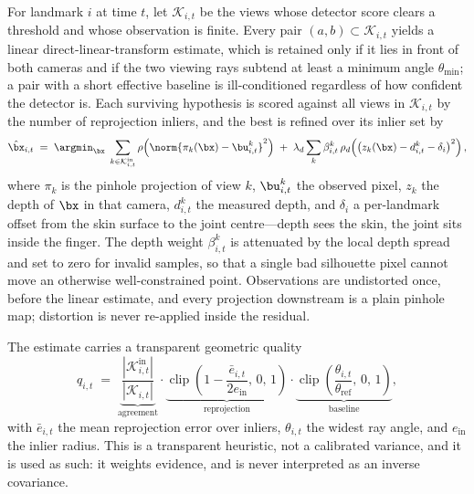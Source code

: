 For landmark $i$ at time $t$, let $\mathcal{K}_{i,t}$ be the views whose
detector score clears a threshold and whose observation is finite. Every pair
$(a,b) \subset \mathcal{K}_{i,t}$ yields a linear direct-linear-transform
estimate, which is retained only if it lies in front of both cameras and if the
two viewing rays subtend at least a minimum angle $\theta_{\min}$; a pair with a
short effective baseline is ill-conditioned regardless of how confident the
detector is. Each surviving hypothesis is scored against all views in
$\mathcal{K}_{i,t}$ by the number of reprojection inliers, and the best is
refined over its inlier set by
\begin{equation}
  \hat{\bx}_{i,t} \;=\;
  \argmin_{\bx}\;
  \sum_{k \in \mathcal{K}^{\text{in}}_{i,t}}
  \rho\!\left(\norm{\pi_k(\bx) - \bu^{k}_{i,t}}^{2}\right)
  \;+\;
  \lambda_d \sum_{k} \beta^{k}_{i,t}\,
  \rho_d\!\left(\left(z_k(\bx) - d^{k}_{i,t} - \delta_i\right)^{2}\right),
  \label{eq:triangulate}
\end{equation}
where $\pi_k$ is the pinhole projection of view $k$, $\bu^{k}_{i,t}$ the
observed pixel, $z_k$ the depth of $\bx$ in that camera, $d^{k}_{i,t}$ the
measured depth, and $\delta_i$ a per-landmark offset from the skin surface to
the joint centre---depth sees the skin, the joint sits inside the finger. The
depth weight $\beta^{k}_{i,t}$ is attenuated by the local depth spread and set
to zero for invalid samples, so that a single bad silhouette pixel cannot move
an otherwise well-constrained point. Observations are undistorted once, before
the linear estimate, and every projection downstream is a plain pinhole map;
distortion is never re-applied inside the residual.

The estimate carries a transparent geometric quality
\begin{equation}
  q_{i,t} \;=\;
  \underbrace{\frac{\left|\mathcal{K}^{\text{in}}_{i,t}\right|}
                   {\left|\mathcal{K}_{i,t}\right|}}_{\text{agreement}}
  \cdot
  \underbrace{\operatorname{clip}\!\left(
      1 - \frac{\bar{e}_{i,t}}{2 e_{\text{in}}},\,0,\,1\right)}_{\text{reprojection}}
  \cdot
  \underbrace{\operatorname{clip}\!\left(
      \frac{\theta_{i,t}}{\theta_{\text{ref}}},\,0,\,1\right)}_{\text{baseline}},
  \label{eq:quality}
\end{equation}
with $\bar{e}_{i,t}$ the mean reprojection error over inliers, $\theta_{i,t}$
the widest ray angle, and $e_{\text{in}}$ the inlier radius. This is a
transparent heuristic, not a calibrated variance, and it is used as such: it
weights evidence, and is never interpreted as an inverse covariance.

